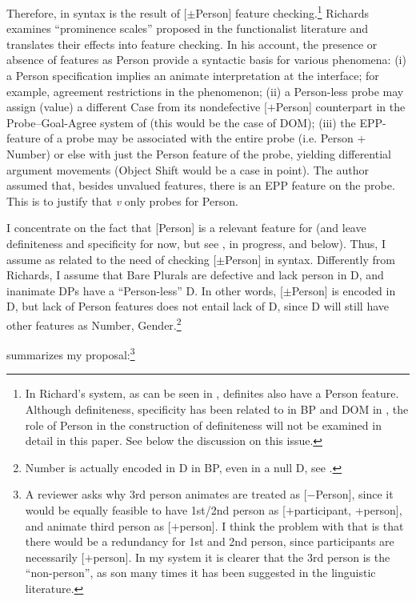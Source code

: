 \documentclass[output=paper]{langsci/langscibook}
\begin{document}
Therefore,  in syntax is the result of [$\pm$Person] feature
checking.\footnote{In Richard's system, as can be seen in ,
definites also have a Person feature. Although definiteness, specificity has
been related to  in \gls{BP} and DOM in , the role of Person in
the construction of definiteness will not be examined in detail in this paper.
See below the discussion on this issue.} Richards examines \enquote{prominence
scales} proposed in the functionalist literature and translates their effects
into feature checking. In his account, the presence or absence of features as
Person provide a syntactic basis for various phenomena: (i) a Person
specification implies an animate interpretation at the interface; for example,
agreement restrictions in the  phenomenon; (ii) a
Person-less probe may assign (value) a different Case from its nondefective
[$+$Person] counterpart in the Probe--Goal-Agree system of \citealt{Chomsky2001}
(this would be the case of DOM); (iii) the \gls{EPP}-feature of a probe may be
associated with the entire probe (i.e. Person + Number) or else with just the
Person feature of the probe, yielding differential argument movements (Object
Shift would be a case in point).  The author assumed that, besides unvalued
features, there is an \gls{EPP} feature on the probe. This is to justify that
\emph{v} only probes for Person.

I concentrate on the fact that [Person] is a relevant feature for  (and
leave definiteness and specificity for now, but see \citealt{IrimiaCyrino2015},
in progress, and below). Thus, I assume  as related to the need of
checking [$\pm$Person] in syntax. Differently from Richards, I assume that Bare
Plurals are defective and lack person in D,  and inanimate DPs have a
\enquote{Person-less} D. In other words, [$\pm$Person] is encoded in D, but lack of
Person features does not entail lack of D, since D will still have other
features as Number, Gender.\footnote{Number is actually encoded in D in
\gls{BP}, even in a null D, see
\citet{CyrinoEspinal2015}.}

 summarizes my proposal:\footnote{A reviewer asks why 3rd
    person animates are treated as [$-$Person], since it would be equally
    feasible to have 1st/2nd person as [$+$participant,
    +person], and animate third person as [$+$person].  I
    think the problem with that is that there would be a redundancy for 1st and
    2nd person, since participants are necessarily
    [$+$person]. In my system it is clearer that the 3rd person is the \enquote{non-person}, as son many times it has been suggested
in the linguistic literature.}
\end{document}

